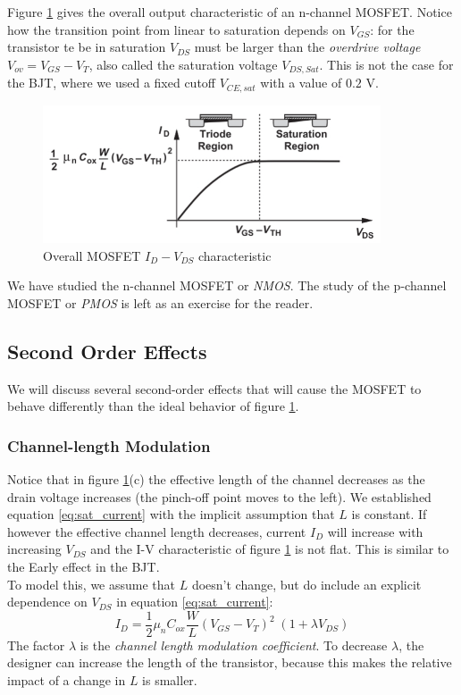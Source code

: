 Figure \ref{fig:mosfet3} gives the overall output characteristic of an n-channel MOSFET. Notice how the transition point from linear to saturation depends on $V_{GS}$: for the transistor te be in saturation $V_{DS}$ must be larger than the \emph{overdrive voltage} $V_{ov} = V_{GS} - V_T$, also called the saturation voltage $V_{DS, Sat}$. This is not the case for the BJT, where we used a fixed cutoff $V_{CE,sat}$ with a value of $0.2$ V.

\begin{figure}[h!]
\centering
\includegraphics[width=10cm]{figures/ch01/mosfet3.jpg}
\caption{Overall MOSFET $I_D - V_{DS}$ characteristic} 
\label{fig:mosfet3}
\end{figure}
We have studied the n-channel MOSFET or \emph{NMOS}. The study of the p-channel MOSFET or \emph{PMOS} is left as an exercise for the reader.

\subsection{Second Order Effects}
We will discuss several second-order effects that will cause the MOSFET to behave differently than the ideal behavior of figure \ref{fig:mosfet3}.
\subsubsection{Channel-length Modulation}
Notice that in figure \ref{fig:mosfet3}(c) the effective length of the channel decreases as the drain voltage increases (the pinch-off point moves to the left). We established equation \ref{eq:sat_current} with the implicit assumption that $L$ is constant. If however the effective channel length decreases, current $I_D$ will increase with increasing $V_{DS}$ and the I-V characteristic of figure \ref{fig:mosfet3} is not flat. This is similar to the Early effect in the BJT.\\
To model this, we assume that $L$ doesn't change, but do include an explicit dependence on $V_{DS}$ in equation \ref{eq:sat_current}:
\begin{equation}
    I_{D} = \frac{1}{2} \mu_n C_{ox} \frac{W}{L} (V_{GS} - V_T)^2 \; (1 + \lambda V_{DS})
    \label{eq:sat_current2}
\end{equation}
The factor $\lambda$ is the \emph{channel length modulation coefficient}. To decrease $\lambda$, the designer can increase the length of the transistor, because this makes the relative impact of a change in $L$ is smaller.
